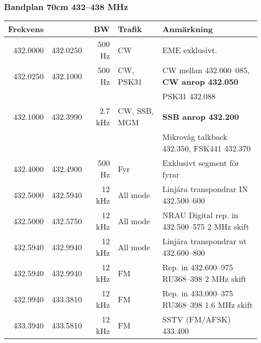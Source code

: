 \begin{landscape}
\subsubsection{Bandplan 70cm 432--438 MHz}
\begin{tabular}{rrrll}
	\textbf{Frekvens}         &               & \textbf{BW}   & \textbf{Trafik}     & \textbf{Anmärkning}                                          \\ \hline
	         432.0000         & 432.0250      & 500 Hz        & CW                  & EME exklusivt.                                               \\ \hline
	         432.0250         & 432.1000      & 500 Hz        & CW, PSK31           & CW mellan 432.000--085, \textbf{CW anrop 432.050}            \\
                                  &               &               &                     & PSK31 432.088                                                \\ \hline
	         432.1000         & 432.3990      & 2.7 kHz       & CW, SSB, MGM        & \textbf{SSB anrop 432.200}                                   \\
                                  &               &               &                     & Mikrovåg talkback 432.350, FSK441 432.370                    \\ \hline
	         432.4000         & 432.4900      & 500 Hz        & Fyr                 & Exklusivt segment för fyrar                                  \\ \hline
	         432.5000         & 432.5940      & 12 kHz        & All mode            & Linjära transpondrar IN 432.500--600                         \\ \hline
	         432.5000         & 432.5750      & 12 kHz        & All mode            & NRAU Digital rep. in 432.500--575 2 MHz skift                \\ \hline
	         432.5940         & 432.9940      & 12 kHz        & All mode            & Linjära transpondrar ut 432.600--800                         \\ \hline
	         432.5940         & 432.9940      & 12 kHz        & FM                  & Rep. in 432.600--975 RU368--398 2 MHz skift                  \\ \hline
	         432.9940         & 433.3810      & 12 kHz        & FM                  & Rep. in 433.000--375 RU368--398 1.6 MHz skift                \\ \hline
	         433.3940         & 433.5810      & 12 kHz        & FM                  & SSTV (FM/AFSK) 433.400                                       \\

\end{tabular}
\end{landscape}
